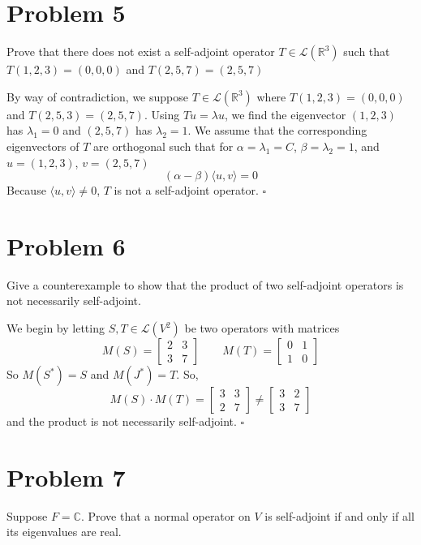 \documentclass[12pt]{article}
\newcommand{\C}{\mathbb{C}}
\newcommand{\R}{\mathbb{R}}
\newenvironment{proof}{\noindent{\bf Proof.}}{\hfill $\square$\medskip}
\begin{document}
\newpage
\section{Problem 5}
Prove that there does not exist a self-adjoint operator $T\in\mathcal{L}(\R^{3})$ such that $T(1,2,3)=(0,0,0)$ and $T(2,5,7)=(2,5,7)$

\begin{proof}
By way of contradiction, we suppose $T\in\mathcal{L}(\R^{3})$ where $T(1,2,3)=(0,0,0)$ and $T(2,5,3)=(2,5,7)$. Using $Tu=\lambda u$, we find the eigenvector $(1,2,3)$ has $\lambda_{1}=0$ and $(2,5,7)$ has $\lambda_{2}=1$. We assume that the corresponding eigenvectors of $T$ are orthogonal such that for $\alpha=\lambda_{1}=C$, $\beta=\lambda_{2}=1$, and $u=(1,2,3)$, $v=(2,5,7)$
$$(\alpha-\beta)\langle u,v\rangle=0$$
Because $\langle u,v\rangle\neq 0$, $T$ is not a self-adjoint operator. 
\end{proof}


\section{Problem 6}
Give a counterexample to show that the product of two self-adjoint operators is not necessarily self-adjoint.

\begin{proof}
We begin by letting $S,T\in\mathcal{L}(V^{2})$ be two operators with matrices
$$M(S)=
\begin{bmatrix}
    2&3\\
    3&7
\end{bmatrix}
\qquad
M(T)=
\begin{bmatrix}
0&1\\
1&0
\end{bmatrix}
$$
So $M(S^{*})=S$ and $M(J^{*})=T$. So,
$$
M(S)\cdot M(T)=
\begin{bmatrix}
3&3\\
2&7
\end{bmatrix}\neq
\begin{bmatrix}
3&2\\
3&7
\end{bmatrix}
$$
and the product is not necessarily self-adjoint.
\end{proof}


\section{Problem 7}
Suppose $F=\C$. Prove that a normal operator on $V$ is self-adjoint if and only if all its eigenvalues are real.
\end{document}
